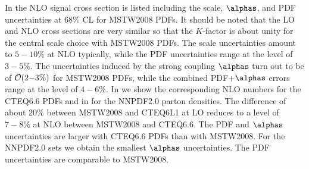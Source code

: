 In  the NLO signal cross section is listed
including the scale, $\alphas$, and PDF uncertainties at 68\% CL for
MSTW2008 PDFs. It should be noted that the LO and NLO cross sections are
very similar so that the $K$-factor is about unity for the central scale
choice with MSTW2008 PDFs. The scale uncertainties amount to $5{-}10\%$ at
NLO typically, while the PDF uncertainties range at the level of $3{-}5\%$.
The uncertainties induced by the strong coupling $\alphas$ turn out to
be of ${\cal O}(2{-}3\%)$ for MSTW2008 PDFs, while the combined
PDF+$\alphas$ errors range at the level of $4{-}6\%$. In 
 we show the corresponding NLO numbers for the CTEQ6.6 PDFs
and in  for the NNPDF2.0 parton densities. The
difference of about $20\%$ between MSTW2008 and CTEQ6L1 at LO reduces to a
level of $7{-}8\%$ at NLO between MSTW2008 and CTEQ6.6. The PDF and
$\alphas$ uncertainties are larger with CTEQ6.6 PDFs than with
MSTW2008. For the NNPDF2.0 sets we obtain the smallest $\alphas$
uncertainties. The PDF uncertainties are comparable to MSTW2008.

